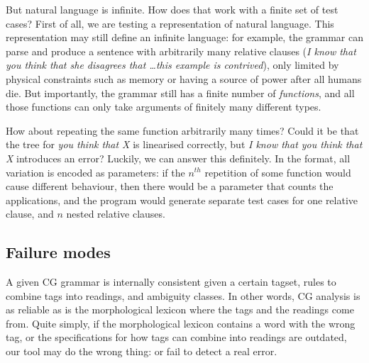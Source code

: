 But natural language is infinite. How does that work with a finite set
of test cases? First of all, we are testing a \pmcfg{} representation
of natural language. This representation may still define an infinite
language: for example, the grammar can parse and produce a sentence
with arbitrarily many relative clauses (\emph{I know that you think
  that she disagrees that \dots this example is contrived}), only
limited by physical constraints such as memory or having a source of
power after all humans die. But importantly, the grammar still has a
finite number of \emph{functions}, and all those functions can only
take arguments of finitely many different types.

How about repeating the same function arbitrarily many times? Could it
be that the tree for {\em you think that X} is linearised correctly,
but {\em I know that you think that X} introduces an error?  Luckily,
we can answer this definitely.  In the \pmcfg{} format, all variation
is encoded as parameters: if the $n^{th}$ repetition of some function
would cause different behaviour, then there would be a parameter that
counts the applications, and the program would generate separate test
cases for one relative clause, and $n$ nested relative clauses.






\subsection{Failure modes}

A given CG grammar is internally consistent given a certain tagset,
rules to combine tags into readings, and ambiguity classes. %
In other words, CG analysis is as reliable as is the morphological
lexicon where the tags and the readings come from. Quite simply, if
the morphological lexicon contains a word with the wrong tag, or the
specifications for how tags can combine into readings are outdated,
our tool may do the wrong thing:  or fail to
detect a real error.

